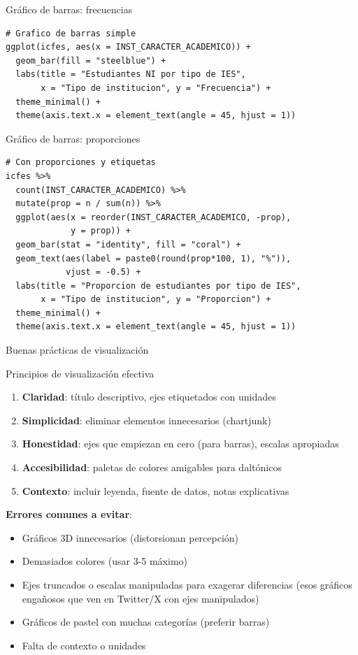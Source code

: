 \documentclass[aspectratio=169, 11pt]{beamer}
\begin{document}
\begin{frame}[fragile]{Gráfico de barras: frecuencias}
\begin{lstlisting}
# Grafico de barras simple
ggplot(icfes, aes(x = INST_CARACTER_ACADEMICO)) +
  geom_bar(fill = "steelblue") +
  labs(title = "Estudiantes NI por tipo de IES",
       x = "Tipo de institucion", y = "Frecuencia") +
  theme_minimal() +
  theme(axis.text.x = element_text(angle = 45, hjust = 1))
\end{lstlisting}
\end{frame}

\begin{frame}[fragile]{Gráfico de barras: proporciones}
\begin{lstlisting}
# Con proporciones y etiquetas
icfes %>%
  count(INST_CARACTER_ACADEMICO) %>%
  mutate(prop = n / sum(n)) %>%
  ggplot(aes(x = reorder(INST_CARACTER_ACADEMICO, -prop),
             y = prop)) +
  geom_bar(stat = "identity", fill = "coral") +
  geom_text(aes(label = paste0(round(prop*100, 1), "%")),
            vjust = -0.5) +
  labs(title = "Proporcion de estudiantes por tipo de IES",
       x = "Tipo de institucion", y = "Proporcion") +
  theme_minimal() +
  theme(axis.text.x = element_text(angle = 45, hjust = 1))
\end{lstlisting}
\end{frame}

\begin{frame}{Buenas prácticas de visualización}
\begin{alertblock}{Principios de visualización efectiva}
\begin{enumerate}
\item \textbf{Claridad}: título descriptivo, ejes etiquetados con unidades
\item \textbf{Simplicidad}: eliminar elementos innecesarios (chartjunk)
\item \textbf{Honestidad}: ejes que empiezan en cero (para barras), escalas apropiadas
\item \textbf{Accesibilidad}: paletas de colores amigables para daltónicos
\item \textbf{Contexto}: incluir leyenda, fuente de datos, notas explicativas
\end{enumerate}
\end{alertblock}

\vspace{0.5em}
\textbf{Errores comunes a evitar}:
\begin{itemize}
\item Gráficos 3D innecesarios (distorsionan percepción)
\item Demasiados colores (usar 3-5 máximo)
\item Ejes truncados o escalas manipuladas para exagerar diferencias (esos gr\'aficos enga\~nosos que ven en Twitter/X con ejes manipulados)
\item Gráficos de pastel con muchas categorías (preferir barras)
\item Falta de contexto o unidades
\end{itemize}
\end{frame}
\end{document}
